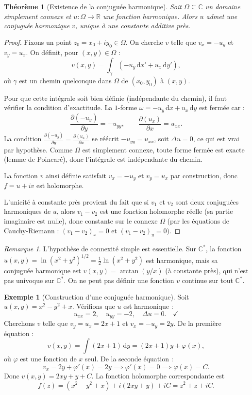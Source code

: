 \documentclass[12pt,a4paper,openany]{book}
\theoremstyle{definition}
\newtheorem{exemple}[definition]{Exemple}
\theoremstyle{plain}
\newtheorem{theoreme}[definition]{Théorème}
\theoremstyle{remark}
\newtheorem{remarque}[definition]{Remarque}
\newcommand{\C}{\mathbb{C}}
\newcommand{\R}{\mathbb{R}}
\newcommand{\dd}{\mathrm{d}}
\begin{document}
\begin{theoreme}[Existence de la conjuguée harmonique]\label{thm:conjuguee-harmonique}
Soit $\Omega \subseteq \C$ un domaine \emph{simplement connexe} et $u : \Omega \to \R$ une fonction harmonique. Alors $u$ admet une conjuguée harmonique $v$, unique à une constante additive près.
\end{theoreme}

\begin{proof}
Fixons un point $z_0 = x_0 + iy_0 \in \Omega$. On cherche $v$ telle que $v_x = -u_y$ et $v_y = u_x$. On définit, pour $(x,y) \in \Omega$ :
\[
  v(x,y) = \int_\gamma \left(-u_y\,\dd x' + u_x\,\dd y'\right),
\]
où $\gamma$ est un chemin quelconque dans $\Omega$ de $(x_0, y_0)$ à $(x,y)$.

Pour que cette intégrale soit bien définie (indépendante du chemin), il faut vérifier la condition d'exactitude. La $1$-forme $\omega = -u_y\,\dd x + u_x\,\dd y$ est fermée car :
\[
  \frac{\partial(-u_y)}{\partial y} = -u_{yy}, \qquad \frac{\partial(u_x)}{\partial x} = u_{xx}.
\]
La condition $\frac{\partial(-u_y)}{\partial y} = \frac{\partial(u_x)}{\partial x}$ se réécrit $-u_{yy} = u_{xx}$, soit $\Delta u = 0$, ce qui est vrai par hypothèse. Comme $\Omega$ est simplement connexe, toute forme fermée est exacte (lemme de Poincaré), donc l'intégrale est indépendante du chemin.

La fonction $v$ ainsi définie satisfait $v_x = -u_y$ et $v_y = u_x$ par construction, donc $f = u + iv$ est holomorphe.

L'unicité à constante près provient du fait que si $v_1$ et $v_2$ sont deux conjuguées harmoniques de $u$, alors $v_1 - v_2$ est une fonction holomorphe réelle (sa partie imaginaire est nulle), donc constante sur le connexe $\Omega$ (par les équations de Cauchy-Riemann : $(v_1 - v_2)_x = 0$ et $(v_1 - v_2)_y = 0$).
\end{proof}

\begin{remarque}\label{rem:connexite-simple-necessaire}
L'hypothèse de connexité simple est essentielle. Sur $\C^*$, la fonction $u(x,y) = \ln(x^2+y^2)^{1/2} = \frac{1}{2}\ln(x^2+y^2)$ est harmonique, mais sa conjuguée harmonique est $v(x,y) = \arctan(y/x)$ (à constante près), qui n'est pas univoque sur $\C^*$. On ne peut pas définir une fonction $v$ continue sur tout $\C^*$.
\end{remarque}

\begin{exemple}[Construction d'une conjuguée harmonique]\label{ex:conjuguee-harmonique}
Soit $u(x,y) = x^2 - y^2 + x$. Vérifions que $u$ est harmonique :
\[
  u_{xx} = 2, \quad u_{yy} = -2, \quad \Delta u = 0. \quad \checkmark
\]
Cherchons $v$ telle que $v_y = u_x = 2x + 1$ et $v_x = -u_y = 2y$. De la première équation :
\[
  v(x,y) = \int (2x+1)\,\dd y = (2x+1)y + \varphi(x),
\]
où $\varphi$ est une fonction de $x$ seul. De la seconde équation :
\[
  v_x = 2y + \varphi'(x) = 2y \implies \varphi'(x) = 0 \implies \varphi(x) = C.
\]
Donc $v(x,y) = 2xy + y + C$. La fonction holomorphe correspondante est
\[
  f(z) = (x^2-y^2+x) + i(2xy+y) + iC = z^2 + z + iC.
\]
\end{exemple}
\end{document}
